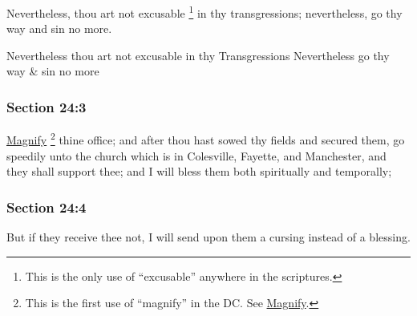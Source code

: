		Nevertheless, thou art not excusable%
			\footnote{%
				This is the only use of ``excusable'' anywhere in the scriptures. 
				}
		in thy transgressions; nevertheless, go thy way and sin no more.

		\begin{framed}
		\scriptsize
			\begin{compactdesc}
				\item[JSP] Nevertheless thou art not excusable in thy Transgressions Nevertheless go thy way \& sin no more
			\end{compactdesc}
		\end{framed}

	\subsubsection{Section 24:3} %
		\label{DC24-3}

		\hyperref[MAGNIFY]{Magnify}%
			\footnote{%
				This is the first use of ``magnify'' in the DC. See \hyperref[MAGNIFY]{Magnify}.
				}
		thine office; and after thou hast sowed thy fields and secured them, go speedily unto the church which is in Colesville, Fayette, and Manchester, and they shall support thee; and I will bless them both spiritually and temporally;


	\subsubsection{Section 24:4} %
		\label{DC24-4}

		But if they receive thee not, I will send upon them a cursing instead of a blessing.


